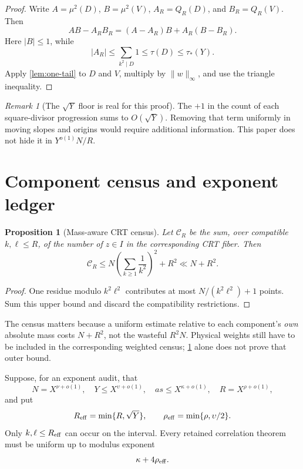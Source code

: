 \documentclass[11pt]{article}
\newtheorem{proposition}[theorem]{Proposition}
\theoremstyle{definition}
\theoremstyle{remark}
\newtheorem{remark}[theorem]{Remark}
\begin{document}
\begin{proof}
Write \(A=\mu^2(D)\), \(B=\mu^2(V)\),
\(A_R=Q_R(D)\), and \(B_R=Q_R(V)\).  Then
\[
 AB-A_RB_R=(A-A_R)B+A_R(B-B_R).
\]
Here \(|B|\le1\), while
\[
 |A_R|\le\sum_{k^2\mid D}1\le\tau(D)\le\tau_*(Y).
\]
Apply \cref{lem:one-tail} to \(D\) and \(V\), multiply by
\(\|w\|_\infty\), and use the triangle inequality.
\end{proof}

\begin{remark}[The \(\sqrt Y\) floor is real for this proof]
The \(+1\) in the count of each square-divisor progression sums to
\(O(\sqrt Y)\).  Removing that term uniformly in moving slopes and
origins would require additional information.  This paper does not
hide it in \(Y^{o(1)}N/R\).
\end{remark}

\section{Component census and exponent ledger}

\begin{proposition}[Mass-aware CRT census]
\label{prop:census}
Let \(\mathcal C_R\) be the sum, over compatible \(k,\ell\le R\), of
the number of \(z\in I\) in the corresponding CRT fiber.  Then
\begin{equation}
 \mathcal C_R
 \le
 N\left(\sum_{k\ge1}\frac1{k^2}\right)^2+R^2
 \ll N+R^2.
\label{eq:census}
\end{equation}
\end{proposition}

\begin{proof}
One residue modulo \(k^2\ell^2\) contributes at most
\(N/(k^2\ell^2)+1\) points.  Sum this upper bound and discard the
compatibility restrictions.
\end{proof}

The census matters because a uniform estimate relative to each
component's \emph{own} absolute mass costs \(N+R^2\), not the
wasteful \(R^2N\).  Physical weights still have to be included in
the corresponding weighted census; \cref{prop:census} alone does
not prove that outer bound.

Suppose, for an exponent audit, that
\[
 N=X^{\nu+o(1)},\quad
 Y\le X^{\upsilon+o(1)},\quad
 as\le X^{\kappa+o(1)},\quad
 R=X^{\rho+o(1)},
\]
and put
\begin{equation}
 R_{\rm eff}=\min\{R,\sqrt Y\},
 \qquad
 \rho_{\rm eff}=\min\{\rho,\upsilon/2\}.
\label{eq:effective-cutoff}
\end{equation}
Only \(k,\ell\le R_{\rm eff}\) can occur on the interval.  Every retained
correlation theorem must be uniform up to modulus exponent
\begin{equation}
 \kappa+4\rho_{\rm eff}.
\label{eq:uniformity-cost}
\end{equation}
\end{document}
